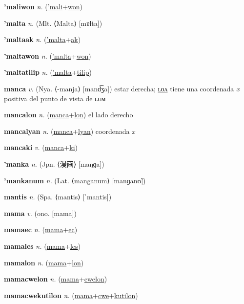 \textbf{\hypertarget{'maliwon}{'maliwon}} \textit{n.} (\hyperlink{'mali}{'mali}+\allowbreak \hyperlink{won}{won})


\textbf{\hypertarget{'malta}{'malta}} \textit{n.} (Mlt. ⟨Malta⟩ [mɐlta])


\textbf{\hypertarget{'maltaak}{'maltaak}} \textit{n.} (\hyperlink{'malta}{'malta}+\allowbreak \hyperlink{ak}{ak})


\textbf{\hypertarget{'maltawon}{'maltawon}} \textit{n.} (\hyperlink{'malta}{'malta}+\allowbreak \hyperlink{won}{won})


\textbf{\hypertarget{'maltatilip}{'maltatilip}} \textit{n.} (\hyperlink{'malta}{'malta}+\allowbreak \hyperlink{tilip}{tilip})


\textbf{\hypertarget{manca}{manca}} \textit{v.} (Nya. ⟨-manja⟩ [mand͡ʒa])
estar derecha; \hyperlink{mancalon}{ʟᴏᴧ} tiene una coordenada \textit{x} positiva del punto de vista de ʟᴜᴍ

\textbf{\hypertarget{mancalon}{mancalon}} \textit{n.} (\hyperlink{manca}{manca}+\allowbreak \hyperlink{lon}{lon})
el lado derecho

\textbf{\hypertarget{mancalyan}{mancalyan}} \textit{n.} (\hyperlink{manca}{manca}+\allowbreak \hyperlink{lyan}{lyan})
coordenada \textit{x}

\textbf{\hypertarget{mancaki}{mancaki}} \textit{v.} (\hyperlink{manca}{manca}+\allowbreak \hyperlink{ki}{ki})


\textbf{\hypertarget{'manka}{'manka}} \textit{n.} (Jpn. ⟨{\japanese{}漫画}⟩ [maŋɡa])


\textbf{\hypertarget{'mankanum}{'mankanum}} \textit{n.} (Lat. ⟨manganum⟩ [manɡanʊ̃])


\textbf{\hypertarget{mantis}{mantis}} \textit{n.} (Spa. ⟨mantis⟩ [ˈmantis])


\textbf{\hypertarget{mama}{mama}} \textit{v.} (ono. [mama])


\textbf{\hypertarget{mamaec}{mamaec}} \textit{n.} (\hyperlink{mama}{mama}+\allowbreak \hyperlink{ec}{ec})


\textbf{\hypertarget{mamales}{mamales}} \textit{n.} (\hyperlink{mama}{mama}+\allowbreak \hyperlink{les}{les})


\textbf{\hypertarget{mamalon}{mamalon}} \textit{n.} (\hyperlink{mama}{mama}+\allowbreak \hyperlink{lon}{lon})


\textbf{\hypertarget{mamacwelon}{mamacwelon}} \textit{n.} (\hyperlink{mama}{mama}+\allowbreak \hyperlink{cwelon}{cwelon})


\textbf{\hypertarget{mamacwekutilon}{mamacwekutilon}} \textit{n.} (\hyperlink{mama}{mama}+\allowbreak \hyperlink{cwe}{cwe}+\allowbreak \hyperlink{kutilon}{kutilon})


